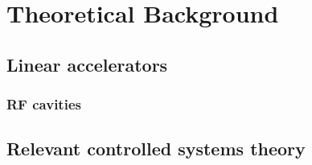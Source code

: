 \chapter{Theoretical Background}
\section{Linear accelerators}
\subsection{RF cavities}
\section{Relevant controlled systems theory}